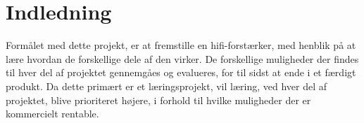 \chapter{Indledning}
\label{indledning}
Formålet med dette projekt, er at fremstille en hifi-forstærker, med henblik på at lære hvordan de forskellige dele af den virker. De forskellige muligheder der findes til hver del af projektet gennemgåes og evalueres, for til sidst at ende i et færdigt produkt. Da dette primært er et læringsprojekt, vil læring, ved hver del af projektet, blive prioriteret højere, i forhold til hvilke muligheder der er kommercielt rentable.